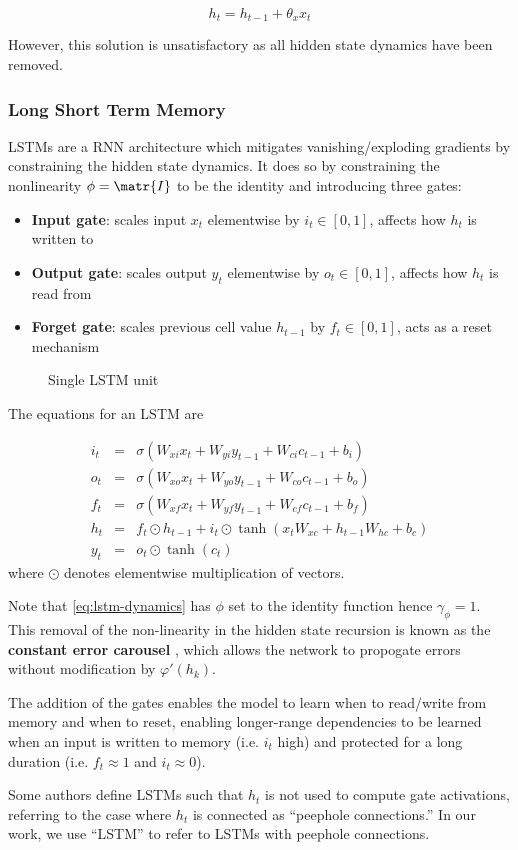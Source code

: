 \begin{equation}
    h_t = h_{t-1} + \theta_x x_t
\end{equation}

However, this solution is unsatisfactory as all hidden state dynamics have been
removed.

\subsubsection{Long Short Term Memory}

LSTMs are a RNN architecture which mitigates vanishing/exploding gradients by constraining
the hidden state dynamics. It does so by constraining the nonlinearity $\phi = \matr{I}$ to be the
identity and introducing three gates:
\begin{itemize}
    \item \textbf{Input gate}: scales input $x_t$ elementwise by $i_t \in [0,1]$, affects how $h_t$ is written to
    \item \textbf{Output gate}: scales output $y_t$ elementwise by $o_t \in [0,1]$, affects how $h_t$ is read from
    \item \textbf{Forget gate}: scales previous cell value $h_{t-1}$ by $f_t \in [0,1]$, acts as a reset mechanism
\end{itemize}

\begin{figure}[htpb]
    \centering
    \caption{Single LSTM unit}
    \label{fig:lstm-unit}
\end{figure}

The equations for an LSTM are

\begin{eqnarray}
    i_t &=& \sigma(W_{xi} x_t + W_{yi} y_{t-1} + W_{ci} c_{t-1} + b_i) \\
    o_t &=& \sigma(W_{xo} x_t + W_{yo} y_{t-1} + W_{co} c_{t-1} + b_o) \\
    f_t &=& \sigma(W_{xf} x_t + W_{yf} y_{t-1} + W_{cf} c_{t-1} + b_f) \\
    h_t &=& f_t \odot h_{t-1} + i_t \odot \tanh(x_t W_{xc} + h_{t-1} W_{hc} + b_c) \label{eq:lstm-dynamics} \\
    y_t &=& o_t \odot \tanh(c_t)
\end{eqnarray}
where $\odot$ denotes elementwise multiplication of vectors.

Note that \autoref{eq:lstm-dynamics} has $\phi$ set to the identity function
hence $\gamma_\phi = 1$. This removal of the non-linearity in the hidden state
recursion is known as the \textbf{constant error carousel} , which
allows the network to propogate errors without modification by $\varphi'(h_k)$.

The addition of the gates enables the model to learn when to read/write from
memory and when to reset, enabling longer-range dependencies to be learned when
an input is written to memory (i.e. $i_t$ high) and protected for a long
duration (i.e. $f_t \approx 1$ and $i_t \approx 0$).

Some authors define LSTMs such that $h_t$ is not used to compute gate activations,
referring to the case where $h_t$ is connected as ``peephole connections.'' In our
work, we use ``LSTM'' to refer to LSTMs with peephole connections.
